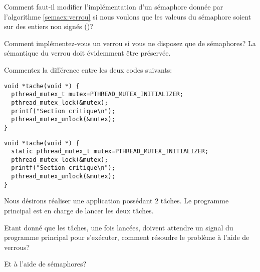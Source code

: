 \startexercice

Comment faut-il modifier l'implémentation d'un sémaphore donnée par l'algorithme \ref{semaex:verrou} si nous voulons que les valeurs du sémaphore soient sur des entiers non signés ()?

\startexercice

Comment implémentez-vous un verrou si vous ne disposez que de sémaphores? La sémantique du verrou doit évidemment être préservée.


\startexercice

Commentez la différence entre les deux codes suivants:

\begin{lstlisting}
void *tache(void *) {
  pthread_mutex_t mutex=PTHREAD_MUTEX_INITIALIZER;
  pthread_mutex_lock(&mutex);
  printf("Section critique\n");
  pthread_mutex_unlock(&mutex);
}
\end{lstlisting}

\begin{lstlisting}
void *tache(void *) {
  static pthread_mutex_t mutex=PTHREAD_MUTEX_INITIALIZER;
  pthread_mutex_lock(&mutex);
  printf("Section critique\n");
  pthread_mutex_unlock(&mutex);
}
\end{lstlisting}

\startexercice

Nous désirons réaliser une application possédant 2 tâches. Le programme principal est en charge de lancer les deux tâches.

Etant donné que les tâches, une fois lancées, doivent attendre un signal du programme principal pour s'exécuter, comment résoudre le problème à l'aide de verrous?

Et à l'aide de sémaphores?
